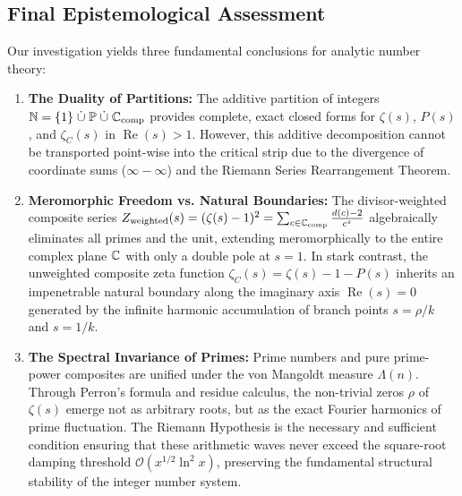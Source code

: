 \subsection{Final Epistemological Assessment}

Our investigation yields three fundamental conclusions for analytic number theory:
\begin{enumerate}
  \item \textbf{The Duality of Partitions:} The additive partition of integers $\mathbb{N} = \{1\} \;\dot{\cup}\; \mathbb{P} \;\dot{\cup}\; \mathbb{C}_{\mathrm{comp}}$ provides complete, exact closed forms for $\zeta(s)$, $P(s)$, and $\zeta_C(s)$ in $\operatorname{Re}(s) > 1$. However, this additive decomposition cannot be transported point-wise into the critical strip due to the divergence of coordinate sums ($\infty - \infty$) and the Riemann Series Rearrangement Theorem.
  \item \textbf{Meromorphic Freedom vs. Natural Boundaries:} The divisor-weighted composite series $Z_{\mathrm{weighted}}(s) = (\zeta(s)-1)^2 = \sum_{c \in \mathbb{C}_{\mathrm{comp}}} \frac{d(c)-2}{c^s}$ algebraically eliminates all primes and the unit, extending meromorphically to the entire complex plane $\mathbb{C}$ with only a double pole at $s = 1$. In stark contrast, the unweighted composite zeta function $\zeta_C(s) = \zeta(s) - 1 - P(s)$ inherits an impenetrable natural boundary along the imaginary axis $\operatorname{Re}(s) = 0$ generated by the infinite harmonic accumulation of branch points $s = \rho/k$ and $s = 1/k$.
  \item \textbf{The Spectral Invariance of Primes:} Prime numbers and pure prime-power composites are unified under the von Mangoldt measure $\Lambda(n)$. Through Perron's formula and residue calculus, the non-trivial zeros $\rho$ of $\zeta(s)$ emerge not as arbitrary roots, but as the exact Fourier harmonics of prime fluctuation. The Riemann Hypothesis is the necessary and sufficient condition ensuring that these arithmetic waves never exceed the square-root damping threshold $\mathcal{O}(x^{1/2}\ln^2 x)$, preserving the fundamental structural stability of the integer number system.
\end{enumerate}

